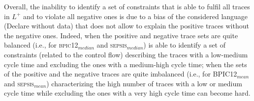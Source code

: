 Overall, the inability to identify a set of constraints that is able to fulfil all traces  in $L^+$ and to violate all negative ones is due to a bias of the considered language (Declare without data) that does not allow to explain the positive traces without the negative ones.
 Indeed, when the positive and negative trace sets are quite balanced (i.e., for \textsc{bpic12$_{median}$} and \textsc{sepsis$_{median}$}) \nd is able to identify a set of constraints (related to the control flow) describing the traces with a low-medium cycle time and excluding the ones with a medium-high cycle time; when the sets of the positive and the negative traces are quite imbalanced (i.e., for \textsc{BPIC12$_{mean}$} and \textsc{sepsis$_{mean}$}) characterizing the high number of traces with a low or medium cycle time while excluding the ones with a very high cycle time can become hard.


